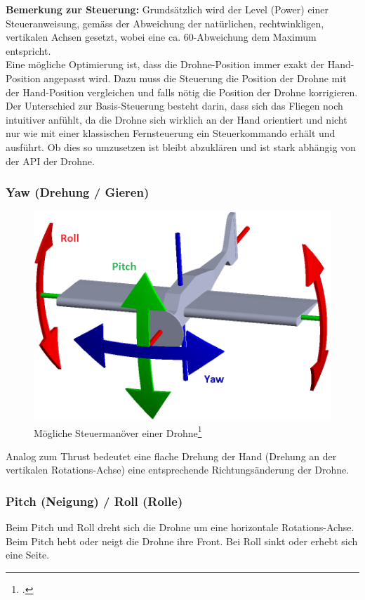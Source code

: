 \textbf{Bemerkung zur Steuerung:} Grundsätzlich wird der Level (Power) einer Steueranweisung, gemäss der Abweichung der natürlichen, rechtwinkligen, vertikalen Achsen gesetzt, wobei eine ca. 60\textdegree-Abweichung dem Maximum entspricht.\\
Eine mögliche Optimierung ist, dass die Drohne-Position immer exakt der Hand-Position angepasst wird.
Dazu muss die Steuerung die Position der Drohne mit der Hand-Position vergleichen und falls nötig die Position der Drohne korrigieren.
Der Unterschied zur Basis-Steuerung besteht darin, dass sich das Fliegen noch intuitiver anfühlt, da die Drohne sich wirklich an der Hand orientiert und nicht nur wie mit einer klassischen Fernsteuerung ein Steuerkommando erhält und ausführt.
Ob dies so umzusetzen ist bleibt abzuklären und ist stark abhängig von der API der Drohne.

\subsubsection{Yaw (Drehung / Gieren)}
\begin{figure}
	\includegraphics[width=1.0\linewidth]{images/concept/yaw_pitch_roll.png}
	\caption[Steuermanöver]{Mögliche Steuermanöver einer Drohne\protect\footcite{IaTsI_2015-03-25}}
\end{figure}
Analog zum Thrust bedeutet eine flache Drehung der Hand (Drehung an der vertikalen Rotations-Achse) eine entsprechende Richtungsänderung der Drohne.

\subsubsection{Pitch (Neigung) / Roll (Rolle)}
Beim Pitch und Roll dreht sich die Drohne um eine horizontale Rotations-Achse. Beim Pitch hebt oder neigt die Drohne ihre Front. Bei Roll sinkt oder erhebt sich eine Seite.

